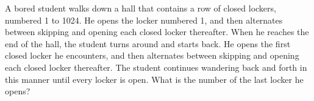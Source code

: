 A bored student walks down a hall that contains a row of closed lockers, numbered 1 to 1024.  He opens the locker numbered 1, and then alternates between skipping and opening each closed locker thereafter.  When he reaches the end of the hall, the student turns around and starts back.  He opens the first closed locker he encounters, and then alternates between skipping and opening each closed locker thereafter. The student continues wandering back and forth in this manner until every locker is open.  What is the number of the last locker he opens?
